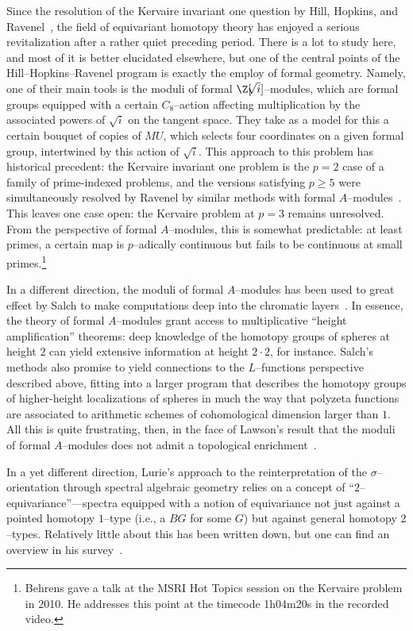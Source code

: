Since the resolution of the Kervaire invariant one question by Hill, Hopkins, and Ravenel~\cite{HHR}, the field of equivariant homotopy theory has enjoyed a serious revitalization after a rather quiet preceding period.  There is a lot to study here, and most of it is better elucidated elsewhere, but one of the central points of the Hill--Hopkins--Ravenel program is exactly the employ of formal geometry.  Namely, one of their main tools is the moduli of formal \(\Z[\!\!\sqrt{i}]\)--modules, which are formal groups equipped with a certain \(C_8\)--action affecting multiplication by the associated powers of \(\!\!\sqrt{i}\) on the tangent space.  They take as a model for this a certain bouquet of copies of \(MU\), which selects four coordinates on a given formal group, intertwined by this action of \(\!\!\sqrt{i}\).  This approach to this problem has historical precedent: the Kervaire invariant one problem is the \(p = 2\) case of a family of prime-indexed problems, and the versions satisfying \(p \ge 5\) were simultaneously resolved by Ravenel by similar methods with formal \(A\)--modules~\cite{RavenelNonexistenceArfInvariantElts}.  This leaves one case open: the Kervaire problem at \(p = 3\) remains unresolved.  From the perspective of formal \(A\)--modules, this is somewhat predictable: at least primes, a certain map is \(p\)--adically continuous but fails to be continuous at small primes.\footnote{Behrens gave a talk at the MSRI Hot Topics session on the Kervaire problem in 2010.  He addresses this point at the timecode 1h04m20s in the recorded video.}

In a different direction, the moduli of formal \(A\)--modules has been used to great effect by Salch to make computations deep into the chromatic layers~\cite{Salch}.  In essence, the theory of formal \(A\)--modules grant access to multiplicative ``height amplification'' theorems: deep knowledge of the homotopy groups of spheres at height \(2\) can yield extensive information at height \(2 \cdot 2\), for instance.  Salch's methods also promise to yield connections to the \(L\)--functions perspective described above, fitting into a larger program that describes the homotopy groups of higher-height localizations of spheres in much the way that polyzeta functions are associated to arithmetic schemes of cohomological dimension larger than \(1\).  All this is quite frustrating, then, in the face of Lawson's result that the moduli of formal \(A\)--modules does not admit a topological enrichment~\cite{LawsonRealizability}.

In a yet different direction, Lurie's approach to the reinterpretation of the \(\sigma\)--orientation through spectral algebraic geometry relies on a concept of ``\(2\)--equivariance''---spectra equipped with a notion of equivariance not just against a pointed homotopy \(1\)--type (i.e., a \(BG\) for some \(G\)) but against general homotopy \(2\)--types.  Relatively little about this has been written down, but one can find an overview in his survey~\cite[Section 5.3]{LurieSurveyOfEll}.



